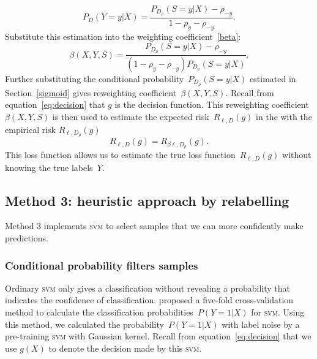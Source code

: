 \documentclass[12pt]{article} %
\newcommand{\svm}{\textsc{svm}}
\newcommand{\loss}{\ell}
\begin{document}
\begin{equation}
    P_D(Y=y|X)=\frac{P_{D_\rho}(S=y|X)-\rho_{-y}}{1-\rho_{y}-\rho_{-y}}.
\end{equation}
Substitute this estimation into the weighting coefficient~\eqref{beta}:
\begin{equation} \label{eq:weighting}
    \beta(X,Y,S)=\frac{P_{D_\rho}(S=y|X)-\rho_{-y}}{(1-\rho_{y}-\rho_{-y})P_{D_\rho}(S=y|X)}.
\end{equation}
Further substituting the conditional probability~$P_{D_\rho}(S=y|X)$ estimated in Section~\ref{sigmoid} gives reweighting coefficient~$\beta(X,Y,S)$. 
Recall from equation~\eqref{eq:decision} that  $g$ is the decision function. 
This reweighting coefficient~$\beta(X,Y,S)$ is then used to estimate the expected risk~$R_{\loss,D}(g)$ in the with the empirical risk $R_{\loss,D_\rho}(g)$
\begin{equation}
R_{\loss,D}(g) = R_{\beta \loss,D_\rho}(g). \label{eq:loss}
\end{equation}
This loss function allows us to estimate the true loss function~$R_{\loss,D}(g)$ without knowing the true labels~$Y$. 

\subsection{Method 3: heuristic approach by relabelling}\label{2nd}
Method 3 implements \textsc{svm} to select samples that we can more confidently make predictions. 

\subsubsection{Conditional probability filters samples}\label{2nd2}
Ordinary \textsc{svm} only gives a classification without revealing a probability that indicates the confidence of classification. 
\citet{Wu03probabilityestimates} proposed a five-fold cross-validation method to calculate the classification probabilities~$P(Y=1|X)$ for \textsc{svm}. 
Using this method, we calculated the probability~$P(Y=1|X)$ with label noise by a pre-training \textsc{svm} with Gaussian kernel. Recall from equation~\eqref{eq:decision} that we use $g(X)$ to denote the decision made by this \svm .
\end{document}
